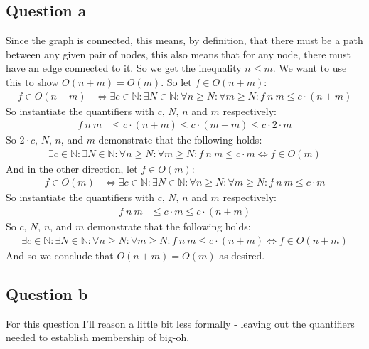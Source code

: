 \subsection*{Question a}

Since the graph is connected, this means, by definition, that there must be a
path between any given pair of nodes, this also means that for any node, there
must have an edge connected to it. So we get the inequality $n \leq m$. We want
to use this to show $O(n+m)=O(m)$. So let $f \in O(n+m)$:
%
\begin{align*}
  f \in O(n + m) & \Leftrightarrow
  \exists c \in \mathbb{N} \colon \exists N \in \mathbb{N} \colon \forall n \geq N \colon \forall m \geq N \colon
  f\ n\ m \leq c \cdot ( n + m )
\end{align*}
%
So instantiate the quantifiers with $c$, $N$, $n$ and $m$ respectively:
%
\begin{align*}
  f\ n\ m & \leq c \cdot ( n + m ) \leq c \cdot ( m + m ) \leq c \cdot 2 \cdot m
\end{align*}
%
So $2 \cdot c$, $N$, $n$, and $m$ demonstrate that the following holds:
%
\begin{align*}
    \exists c \in \mathbb{N} \colon \exists N \in \mathbb{N} \colon \forall n \geq N \colon \forall m \geq N \colon
    f\ n\ m \leq c \cdot m \Leftrightarrow f \in O(m)
\end{align*}
%
And in the other direction, let $f \in O(m)$:
%
\begin{align*}
  f \in O(m) & \Leftrightarrow
  \exists c \in \mathbb{N} \colon \exists N \in \mathbb{N} \colon \forall n \geq N \colon \forall m \geq N \colon
  f\ n\ m \leq c \cdot m
\end{align*}
%
So instantiate the quantifiers with $c$, $N$, $n$ and $m$ respectively:
%
\begin{align*}
  f\ n\ m & \leq c \cdot m \leq c \cdot ( n + m )
\end{align*}
%
So $c$, $N$, $n$, and $m$ demonstrate that the following holds:
%
\begin{align*}
  \exists c \in \mathbb{N} \colon \exists N \in \mathbb{N} \colon \forall n \geq N \colon \forall m \geq N \colon
  f\ n\ m \leq c \cdot (n + m) \Leftrightarrow f \in O(n + m)
\end{align*}
%
And so we conclude that $O(n+m) = O(m)$ as desired. \QED
%
\subsection*{Question b}
%
For this question I'll reason a little bit less formally - leaving out the
quantifiers needed to establish membership of big-oh.

